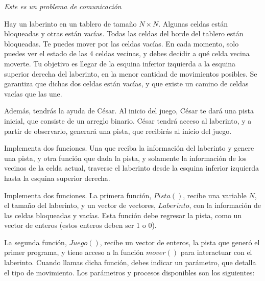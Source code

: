 \documentclass[12pt]{scrartcl}
\begin{document}
    
    {\itshape Este es un problema de comunicación}
    
    \vspace{10pt}

    Hay un laberinto en un tablero de tamaño $N\times N$. Algunas celdas están bloqueadas y otras están vacías. Todas las celdas del borde del tablero están bloqueadas. Te puedes mover por las celdas vacías. En cada momento, solo puedes ver el estado de las 4 celdas vecinas, y debes decidir a qué celda vecina moverte. Tu objetivo es llegar de la esquina inferior izquierda a la esquina superior derecha del laberinto, en la menor cantidad de movimientos posibles. Se garantiza que dichas dos celdas están vacías, y que existe un camino de celdas vacías que las une. 

    Además, tendrás la ayuda de César. Al inicio del juego, César te dará una pista inicial, que consiste de un arreglo binario. César tendrá acceso al laberinto, y a partir de observarlo, generará una pista, que recibirás al inicio del juego. 

    
    Implementa dos funciones. Una que reciba la información del laberinto y genere una pista, y otra función que dada la pista, y solamente la información de los vecinos de la celda actual, traverse el laberinto desde la esquina inferior izquierda hasta la esquina superior derecha.


    Implementa dos funciones. La primera función, $Pista()$, recibe una variable $N$, el tamaño del laberinto, y un vector de vectores, $Laberinto$, con la información de las celdas bloqueadas y vacías. Esta función debe regresar la pista, como un vector de enteros (estos enteros deben ser 1 o 0). 
    
    La segunda función, $Juego()$, recibe un vector de enteros, la pista que generó el primer programa, y tiene acceso a la función $mover()$ para interactuar con el laberinto. Cuando llamas dicha función, debes indicar un parámetro, que detalla el tipo de movimiento. Los parámetros y procesos disponibles son los siguientes:
\end{document}
